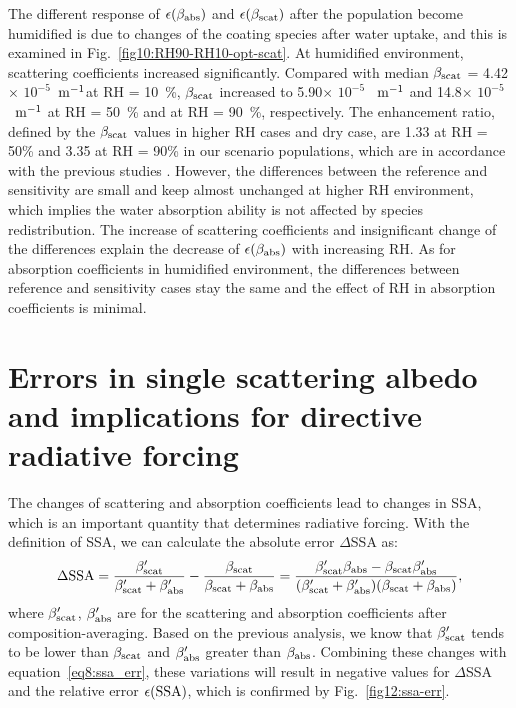 \documentclass[edeposit,fullpage]{uiucthesis2009}
\makeatletter
\DeclareRobustCommand*\unit[1]
 {\ensuremath{%
   {\thinmuskip3mu\relax
    \def\mu{\text{\textmu}}\def~{\,}%
    \ifx\f@series\testbx\mathbf{#1}\else\mathrm{#1}\fi}}}
\makeatother
\begin{document}
The different response of $\epsilon(\beta_{\rm \rm abs})$ and
$\epsilon(\beta_{\rm \rm scat})$ after the population become
humidified is due to changes of the coating species after water
uptake, and this is examined in Fig.~\ref{fig10:RH90-RH10-opt-scat}.
At humidified environment, scattering coefficients increased
significantly.  Compared with median $\beta_{\rm scat}$ = 4.42$\times$
$10^{-5}$~\unit{m^{-1}}at RH = 10~\%, $\beta_{\rm scat}$ increased to
5.90$\times$ $10^{-5}$ ~\unit{m^{-1}} and 14.8$\times$ $10^{-5}$
~\unit{m^{-1}} at RH = 50~\% and at RH = 90~\%, respectively.  The
enhancement ratio, defined by the $\beta_{\rm scat}$ values in higher
RH cases and dry case, are 1.33 at RH = 50\% and 3.35 at RH = 90\% in
our scenario populations, which are in accordance with the previous
studies \citep{Titos2016, Burgos2020}. However, the differences
between the reference and sensitivity are small and keep almost
unchanged at higher RH environment, which implies the water absorption
ability is not affected by species redistribution.  The increase of
scattering coefficients and insignificant change of the differences
explain the decrease of $\epsilon(\beta_{\rm \rm abs})$ with
increasing RH. As for absorption coefficients in humidified
environment, the differences between reference and sensitivity cases
stay the same and the effect of RH in absorption coefficients is
minimal.

\section{Errors in single scattering albedo and implications for directive radiative forcing}
\label{sec:ssa}
The changes of scattering and absorption coefficients lead to changes
in SSA, which is an important quantity that determines radiative
forcing. With the definition of SSA, we can calculate the absolute
error $\Delta$SSA as:
\begin{equation}{\label{eq8:ssa_err}}
\Delta {\rm SSA} = \frac{\beta_{\rm \rm scat}'}{\beta_{\rm \rm scat}' + \beta_{\rm \rm abs}'} - \frac{\beta_{\rm \rm scat}}{\beta_{\rm \rm scat} + \beta_{\rm \rm abs}} = \frac{\beta_{\rm \rm scat}'\beta_{\rm \rm abs} - \beta_{\rm \rm scat}\beta_{\rm \rm abs}'}{(\beta_{\rm \rm scat}' + \beta_{\rm \rm abs}')(\beta_{\rm \rm scat} + \beta_{\rm \rm abs})},
\end{equation}
where $\beta_{\rm scat}'$, $\beta_{\rm abs}'$ are for the scattering
and absorption coefficients after composition-averaging. Based on the
previous analysis, we know that $\beta_{\rm scat}'$ tends to be lower
than $\beta_{\rm scat}$ and $\beta_{\rm abs}'$ greater than
$\beta_{\rm abs}$. Combining these changes with
equation~\ref{eq8:ssa_err}, these variations will result in negative
values for $\Delta$SSA and the relative error $\epsilon(\rm SSA)$,
which is confirmed by Fig.~\ref{fig12:ssa-err}.
\end{document}
